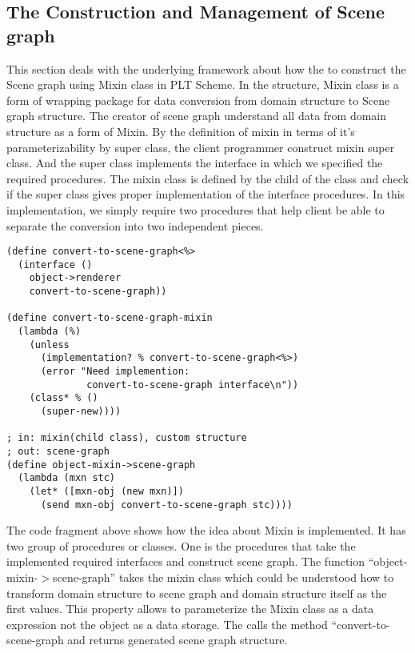\documentclass[preprint,nocopyrightspace]{sigplanconf}
\begin{document}
\subsection{The Construction and Management of Scene graph}
\label{CM_SG}
This section deals with the underlying framework about how the to construct the Scene graph using Mixin class in PLT Scheme. 
In the structure, Mixin class is a form of wrapping package for data conversion from domain structure to Scene graph structure. The creator of scene graph understand all data from domain structure as a form of Mixin. By the definition of mixin in terms of it's parameterizability by super class, the client programmer construct mixin super class. And the super class implements the interface in which we specified the required procedures.
The mixin class is defined by the child of the class and check if the super class gives proper implementation of the interface procedures. 
In this implementation, we simply require two procedures that help client be able to separate the conversion into two independent pieces.

\begin{verbatim}
(define convert-to-scene-graph<%>
  (interface ()
    object->renderer
    convert-to-scene-graph))

(define convert-to-scene-graph-mixin
  (lambda (%)
    (unless 
      (implementation? % convert-to-scene-graph<%>)
      (error "Need implemention: 
              convert-to-scene-graph interface\n"))
    (class* % ()
      (super-new))))

; in: mixin(child class), custom structure
; out: scene-graph
(define object-mixin->scene-graph
  (lambda (mxn stc)
    (let* ([mxn-obj (new mxn)])
      (send mxn-obj convert-to-scene-graph stc))))
\end{verbatim}

The code fragment above shows how the idea about Mixin is implemented. It has two group of procedures or classes. 
One is the procedures that take the implemented required interfaces and construct scene graph. 
The function ``object-mixin-$>$scene-graph'' takes the mixin class which could be understood how to transform domain structure to scene graph and domain structure itself as the first values. 
This property allows to parameterize the Mixin class as a data expression not the object as a data storage. 
The calls the method ``convert-to-scene-graph and returns generated scene graph structure. 
\end{document}
